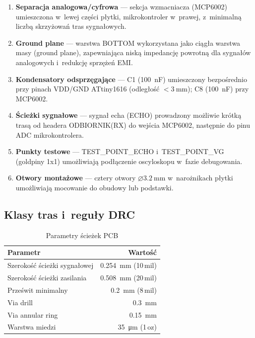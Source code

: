 \documentclass[a4paper,11pt]{article}
\begin{document}
\begin{enumerate}[nosep]
    \item \textbf{Separacja analogowa/cyfrowa} --- sekcja wzmacniacza (MCP6002)
          umieszczona w~lewej części płytki, mikrokontroler w~prawej, z~minimalną
          liczbą skrzyżowań tras sygnałowych.
    \item \textbf{Ground plane} --- warstwa BOTTOM wykorzystana jako ciągła
          warstwa masy (ground plane), zapewniająca niską impedancję powrotną
          dla sygnałów analogowych i~redukcję sprzężeń EMI.
    \item \textbf{Kondensatory odsprzęgające} --- C1 (\SI{100}{\nano\farad})
          umieszczony bezpośrednio przy pinach VDD/GND ATtiny1616 (odległość
          $< \SI{3}{\milli\metre}$); C8 (\SI{100}{\nano\farad}) przy MCP6002.
    \item \textbf{Ścieżki sygnałowe} --- sygnał echa (ECHO) prowadzony
          możliwie krótką trasą od headera ODBIORNIK(RX) do wejścia MCP6002,
          następnie do pinu ADC mikrokontrolera.
    \item \textbf{Punkty testowe} --- TEST\_POINT\_ECHO i~TEST\_POINT\_VG
          (goldpiny 1x1) umożliwiają podłączenie oscyloskopu w~fazie debugowania.
    \item \textbf{Otwory montażowe} --- cztery otwory $\varnothing\SI{3,2}{\milli\metre}$
          w~narożnikach płytki umożliwiają mocowanie do obudowy lub podstawki.
\end{enumerate}

\subsection{Klasy tras i~reguły DRC}

\begin{table}[H]
    \centering
    \caption{Parametry ścieżek PCB}
    \label{tab:pcb_rules}
    \begin{tabular}{lr}
        \toprule
        \textbf{Parametr} & \textbf{Wartość} \\
        \midrule
        Szerokość ścieżki sygnałowej & \SI{0,254}{\milli\metre} (10\,mil) \\
        Szerokość ścieżki zasilania & \SI{0,508}{\milli\metre} (20\,mil) \\
        Prześwit minimalny & \SI{0,2}{\milli\metre} (8\,mil) \\
        Via drill & \SI{0,3}{\milli\metre} \\
        Via annular ring & \SI{0,15}{\milli\metre} \\
        Warstwa miedzi & \SI{35}{\micro\metre} (1\,oz) \\
        \bottomrule
    \end{tabular}
\end{table}
\end{document}
